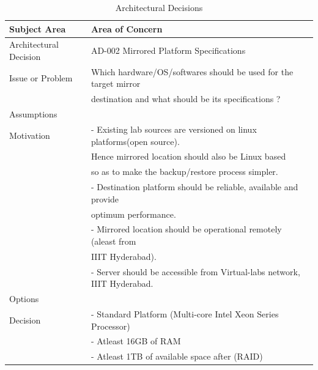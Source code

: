 \documentclass[11pt]{article}
\begin{document}
\begin{table}[H]
\caption{\label{tbl:Platform Specifications}Architectural Decisions}
\begin{center}
\begin{tabular}{ll}
\hline
 Subject Area            &  Area of Concern                                                           \\
\hline
 Architectural Decision  &  AD-002 Mirrored Platform Specifications                                   \\
 Issue or Problem        &  Which hardware/OS/softwares should be used for the target mirror          \\
                         &  destination and what should be its specifications ?                       \\
 Assumptions             &                                                                            \\
 Motivation              &  - Existing lab sources are versioned on linux platforms(open source).     \\
                         &  Hence mirrored location should also be Linux based                        \\
                         &  so as to make the backup/restore process simpler.                         \\
                         &  - Destination platform should be reliable, available and provide          \\
                         &  optimum performance.                                                      \\
                         &  - Mirrored location should be operational remotely (aleast from           \\
                         &  IIIT Hyderabad).                                                          \\
                         &  - Server should be accessible from Virtual-labs network, IIIT Hyderabad.  \\
 Options                 &                                                                            \\
 Decision                &  - Standard Platform (Multi-core Intel Xeon Series Processor)              \\
                         &  - Atleast 16GB of RAM                                                     \\
                         &  - Atleast 1TB of available space after (RAID)                             \\

\end{tabular}
\end{center}
\end{table}
\end{document}
